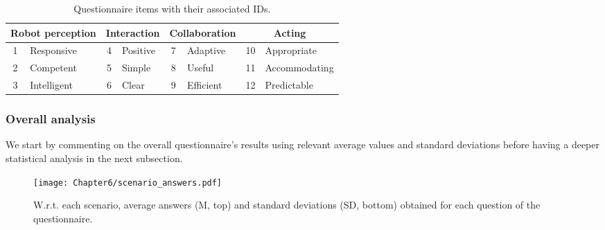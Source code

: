 \begin{table}[h]
    \center
    \begin{tabular}{|cl|cl|cl|cl|}
    \hline
    \multicolumn{2}{|c|}{\textbf{Robot perception}} & \multicolumn{2}{c|}{\textbf{Interaction}} & \multicolumn{2}{c|}{\textbf{Collaboration}} & \multicolumn{2}{c|}{\textbf{Acting}} \\ \hline
    1                 & Responsive                  & 4                & Positive               & 7                & Adaptive                 & 10          & Appropriate            \\ \hline
    2                 & Competent                   & 5                & Simple                 & 8                & Useful                   & 11          & Accommodating          \\ \hline
    3                 & Intelligent                 & 6                & Clear                  & 9                & Efficient                & 12          & Predictable            \\ \hline
    \end{tabular}
    \caption{Questionnaire items with their associated IDs.}
    \label{tab:items_id}
    \end{table}


\subsubsection{Overall analysis}

We start by commenting on the overall questionnaire's results using relevant average values and standard deviations before having a deeper statistical analysis in the next subsection.

\begin{figure}[h]
    \center
    \texttt{[image: Chapter6/scenario\_answers.pdf]}
    \caption{W.r.t. each scenario, average answers (M, top) and standard deviations (SD, bottom) obtained for each question of the questionnaire.}
    \label{fig:scenario_answers}
\end{figure}

